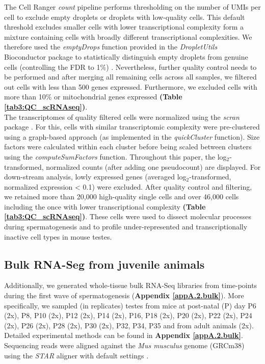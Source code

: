 The Cell Ranger \emph{count} pipeline performs thresholding on the number of UMIs per cell to exclude empty droplets or droplets with low-quality cells. This default threshold excludes smaller cells with lower transcriptional complexity form a mixture containing cells with broadly different transcriptional complexities. We therefore used the \emph{emptyDrops} function provided in the \emph{DropletUtils} Bioconductor package to statistically distinguish empty droplets from genuine cells (controlling the FDR to 1\%) \citep{Lun2018}. Nevertheless, further quality control needs to be performed and after merging all remaining cells across all samples, we filtered out cells with less than 500 genes expressed. Furthermore, we excluded cells with more than 10\% or mitochondrial genes expressed \textbf{(Table \ref{tab3:QC_scRNAseq})}.\\
 
The transcriptomes of quality filtered cells were normalized using the \emph{scran} package \citep{Lun2016pooling}. For this, cells with similar transcriptomic complexity were pre-clustered using a graph-based approach (as implemented in the \emph{quickCluster} function). Size factors were
calculated within each cluster before being scaled between clusters using the \emph{computeSumFactors} function. Throughout this paper, the log$_2$-transformed, normalized counts (after adding one pseudocount) are displayed. For down-stream analysis, lowly expressed genes (averaged log$_2$-transformed, normalized expression < 0.1) were excluded. After quality control and filtering, we retained more than 20,000 high-quality single cells and over 46,000 cells including the once with lower transcriptional complexity \textbf{(Table \ref{tab3:QC_scRNAseq})}. These cells were used to dissect molecular processes during spermatogenesis and to profile under-represented and transcriptionally inactive cell types in mouse testes. 

\subsection{Bulk RNA-Seg from juvenile animals}

Additionally, we generated whole-tissue bulk RNA-Seq libraries from time-points during the first wave of spermatogenesis (\textbf{Appendix \ref{appA.2.bulk}}). More specifically, we sampled (in replicates) testes from mice at post-natal (P) day P6 (2x), P8, P10 (2x), P12 (2x), P14 (2x), P16, P18 (2x), P20 (2x), P22 (2x), P24 (2x), P26 (2x), P28 (2x), P30 (2x), P32, P34, P35 and from adult animals (2x). Detailed experimental methods can be found in \textbf{Appendix \ref{appA.2.bulk}}. 
Sequencing reads were aligned against the \textit{Mus musculus} genome (GRCm38) using the \emph{STAR} aligner with default settings \citep{Dobin2013}. \\

